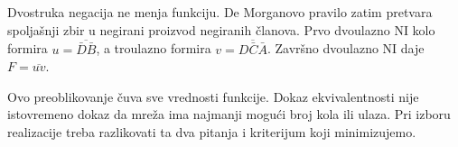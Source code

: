 
Dvostruka negacija ne menja funkciju. De Morganovo pravilo zatim pretvara spoljašnji zbir u negirani proizvod negiranih članova. Prvo dvoulazno NI kolo formira \(u=\overline{\bar D\bar B}\), a troulazno formira \(v=\overline{D\bar C\bar A}\). Završno dvoulazno NI daje \(F=\overline{uv}\).

Ovo preoblikovanje čuva sve vrednosti funkcije. Dokaz ekvivalentnosti nije istovremeno dokaz da mreža ima najmanji mogući broj kola ili ulaza. Pri izboru realizacije treba razlikovati ta dva pitanja i kriterijum koji minimizujemo.
